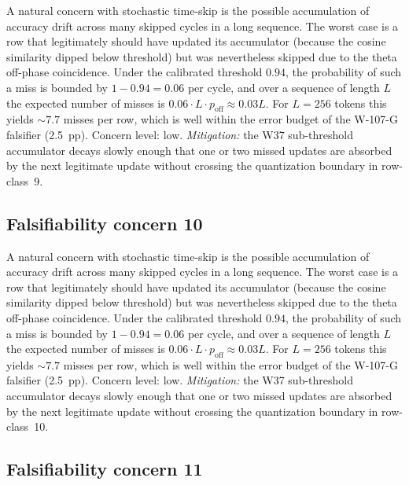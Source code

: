 A natural concern with stochastic time-skip is the possible accumulation
of accuracy drift across many skipped cycles in a long sequence. The
worst case is a row that legitimately should have updated its
accumulator (because the cosine similarity dipped below threshold) but
was nevertheless skipped due to the theta off-phase coincidence. Under
the calibrated threshold $0.94$, the probability of such a miss is
bounded by $1 - 0.94 = 0.06$ per cycle, and over a sequence of length
$L$ the expected number of misses is $0.06 \cdot L \cdot p_{\mathrm{off}}
\approx 0.03 L$. For $L = 256$ tokens this yields $\sim 7.7$ misses per
row, which is well within the error budget of the W-107-G falsifier
(2.5~pp). Concern level: low. \emph{Mitigation:} the W37 sub-threshold
accumulator decays slowly enough that one or two missed updates are
absorbed by the next legitimate update without crossing the
quantization boundary in row-class~9.


\subsection{Falsifiability concern 10}

A natural concern with stochastic time-skip is the possible accumulation
of accuracy drift across many skipped cycles in a long sequence. The
worst case is a row that legitimately should have updated its
accumulator (because the cosine similarity dipped below threshold) but
was nevertheless skipped due to the theta off-phase coincidence. Under
the calibrated threshold $0.94$, the probability of such a miss is
bounded by $1 - 0.94 = 0.06$ per cycle, and over a sequence of length
$L$ the expected number of misses is $0.06 \cdot L \cdot p_{\mathrm{off}}
\approx 0.03 L$. For $L = 256$ tokens this yields $\sim 7.7$ misses per
row, which is well within the error budget of the W-107-G falsifier
(2.5~pp). Concern level: low. \emph{Mitigation:} the W37 sub-threshold
accumulator decays slowly enough that one or two missed updates are
absorbed by the next legitimate update without crossing the
quantization boundary in row-class~10.


\subsection{Falsifiability concern 11}

